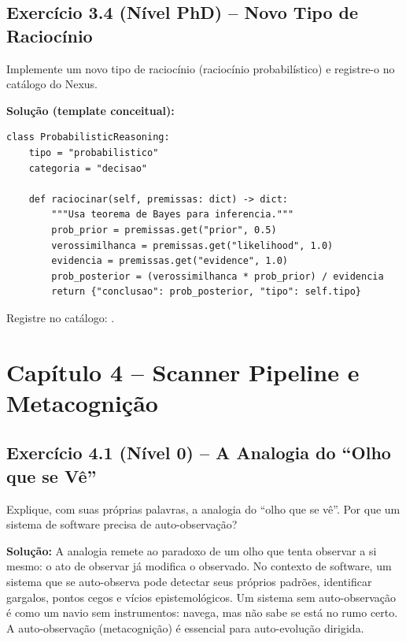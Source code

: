 \subsection*{Exercício 3.4 (Nível PhD) -- Novo Tipo de Raciocínio}
Implemente um novo tipo de raciocínio (raciocínio probabilístico) e
registre-o no catálogo do Nexus.

\textbf{Solução (template conceitual):}
\begin{lstlisting}[style=pythonstyle]
class ProbabilisticReasoning:
    tipo = "probabilistico"
    categoria = "decisao"

    def raciocinar(self, premissas: dict) -> dict:
        """Usa teorema de Bayes para inferencia."""
        prob_prior = premissas.get("prior", 0.5)
        verossimilhanca = premissas.get("likelihood", 1.0)
        evidencia = premissas.get("evidence", 1.0)
        prob_posterior = (verossimilhanca * prob_prior) / evidencia
        return {"conclusao": prob_posterior, "tipo": self.tipo}
\end{lstlisting}

Registre no catálogo: .

\section*{Capítulo 4 -- Scanner Pipeline e Metacognição}

\subsection*{Exercício 4.1 (Nível 0) -- A Analogia do ``Olho que se Vê''}
Explique, com suas próprias palavras, a analogia do ``olho que se vê''.
Por que um sistema de software precisa de auto-observação?

\textbf{Solução:} A analogia remete ao paradoxo de um olho que tenta
observar a si mesmo: o ato de observar já modifica o observado.
No contexto de software, um sistema que se auto-observa pode detectar
seus próprios padrões, identificar gargalos, pontos cegos e vícios
epistemológicos. Um sistema sem auto-observação é como um navio sem
instrumentos: navega, mas não sabe se está no rumo certo. A
auto-observação (metacognição) é essencial para auto-evolução dirigida.

